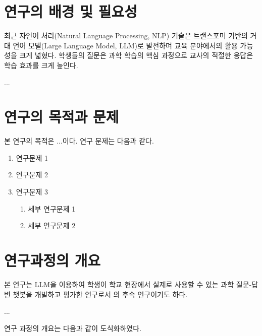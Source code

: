 \section{연구의 배경 및 필요성}\label{c:intro}

최근 자연어 처리(Natural Language Processing, NLP) 기술은 트랜스포머 기반의 거대 언어 모델(Large Language Model, LLM)로 발전하며 교육 분야에서의 활용 가능성을 크게 넓혔다. 학생들의 질문은 과학 학습의 핵심 과정으로 교사의 적절한 응답은 학습 효과를 크게 높인다\citep{chin2008,eshach2014}.

...

\section{연구의 목적과 문제}

본 연구의 목적은 ...이다. 연구 문제는 다음과 같다.

\begin{enumerate}
    \item 연구문제 1
    \item 연구문제 2
    \item 연구문제 3
    \begin{enumerate}
        \item 세부 연구문제 1
        \item 세부 연구문제 2
    \end{enumerate}
\end{enumerate}

\section{연구과정의 개요}

본 연구는 LLM을 이용하여 학생이 학교 현장에서 실제로 사용할 수 있는 과학 질문-답변 챗봇을 개발하고 평가한 연구로서 \cite{min2022, min2024}의 후속 연구이기도 하다.

...

연구 과정의 개요는 다음과 같이 도식화하였다.

\bigskip

